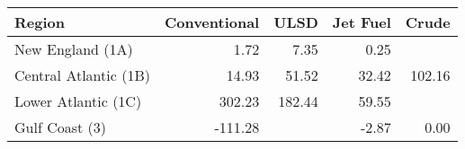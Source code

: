\begin{tabular}{lrrrr}
  \hline
Region & Conventional & ULSD & Jet Fuel & Crude \\ 
  \hline
New England (1A) & 1.72 & 7.35 & 0.25 &  \\ 
  Central Atlantic (1B) & 14.93 & 51.52 & 32.42 & 102.16 \\ 
  Lower Atlantic (1C) & 302.23 & 182.44 & 59.55 &  \\ 
  Gulf Coast (3) & -111.28 &  & -2.87 & 0.00 \\ 
   \hline
\end{tabular}
